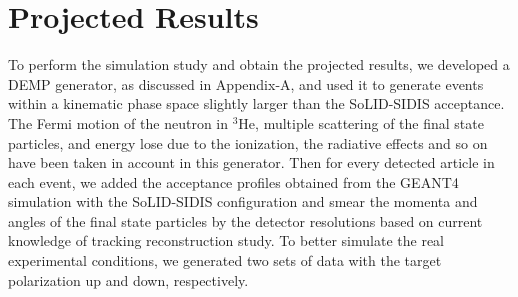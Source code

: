 \section{Projected Results}

To perform the simulation study and obtain the projected results, we developed
a DEMP generator, as discussed in Appendix-A, and used it to generate events
within a kinematic phase space slightly larger than the SoLID-SIDIS acceptance.
The Fermi motion of the neutron in $\mathrm{^{3}He}$, multiple scattering of the final state particles,
 and energy lose due to the ionization, the radiative effects and so on have been taken in account in this generator. 
 Then for every detected article in each event, we added the acceptance profiles obtained from the
GEANT4 simulation with the SoLID-SIDIS configuration and smear the momenta and angles of the final state particles by
 the detector resolutions based on current knowledge of tracking reconstruction study. To better simulate the real experimental conditions, we generated two sets of data with the target polarization up and down, respectively.

